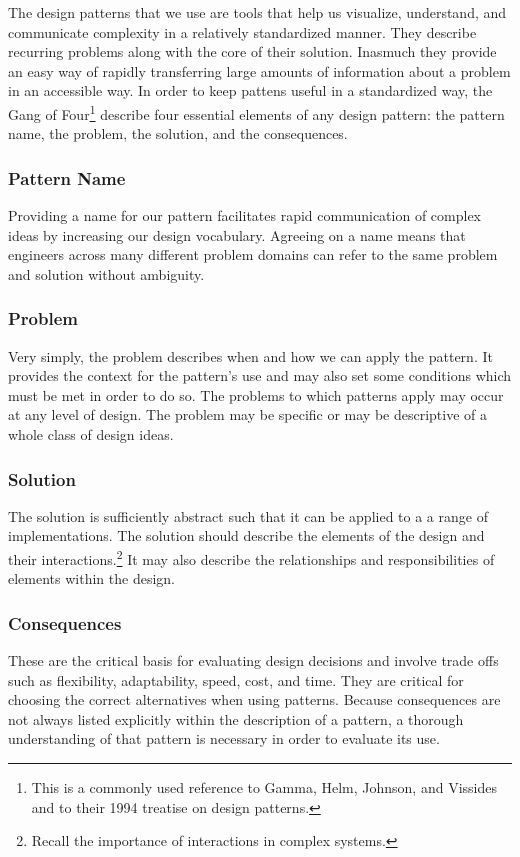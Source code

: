 \documentclass[jou,apacite]{apa6}
\begin{document}
The design patterns that we use are tools that help us visualize, understand, and communicate complexity in a relatively standardized manner.  They describe recurring problems along with the core of their solution.  Inasmuch they provide an easy way of rapidly transferring large amounts of information about a problem in an accessible way.  In order to keep pattens useful in a standardized way, the Gang of Four\footnote{This is a commonly used reference to Gamma, Helm, Johnson, and Vissides and to their 1994 treatise on design patterns.} describe four essential elements of any design pattern: the pattern name, the problem, the solution, and the consequences.~\cite[page 3]{Gamma}

\subsubsection{Pattern Name}
Providing a name for our pattern facilitates rapid communication of complex ideas by increasing our design vocabulary.  Agreeing on a name means that engineers across many different problem domains can refer to the same problem and solution without ambiguity.

\subsubsection{Problem}
Very simply, the problem describes when and how we can apply the pattern.  It provides the context for the pattern's use and may also set some conditions which must be met in order to do so.  The problems to which patterns apply may occur at any level of design.  The problem may be specific or may be descriptive of a whole class of design ideas.

\subsubsection{Solution}
The solution is sufficiently abstract such that it can be applied to a a range of implementations.  The solution should describe the elements of the design and their interactions.\footnote{Recall the importance of interactions in complex systems.}  It may also describe the relationships and responsibilities of elements within the design.

\subsubsection{Consequences}
These are the critical basis for evaluating design decisions and involve trade offs such as flexibility, adaptability, speed, cost, and time.  They are critical for choosing the correct alternatives when using patterns.  Because consequences are not always  listed explicitly within the description of a pattern, a thorough understanding of that pattern is necessary in order to evaluate its use.
\end{document}
